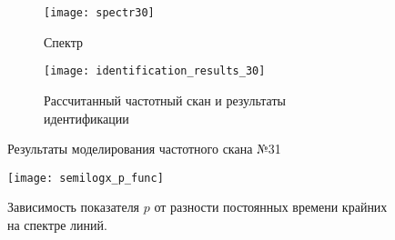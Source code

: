 	\begin{figure}[h!]
		\centering
		\begin{subfigure}[c]{0.3\textwidth}
			\texttt{[image: spectr30]}
			\caption{Спектр}
			\label{pic:results_2_spectr}
		\end{subfigure}
		\begin{subfigure}[c]{0.45\textwidth}
			\texttt{[image: identification\_results\_30]}
			\caption{Рассчитанный частотный скан и результаты идентификации}
			\label{pic:results_2_scan}
		\end{subfigure}
		\caption{Результаты моделирования частотного скана №31}
		\label{pic:result_2}
	\end{figure}

	\begin{figure}[h!]
		\centering
		\texttt{[image: semilogx\_p\_func]}
		\caption{Зависимость показателя $p$ от разности постоянных времени
		крайних на спектре линий.}
		\label{pic:p_delta_tau}
	\end{figure}